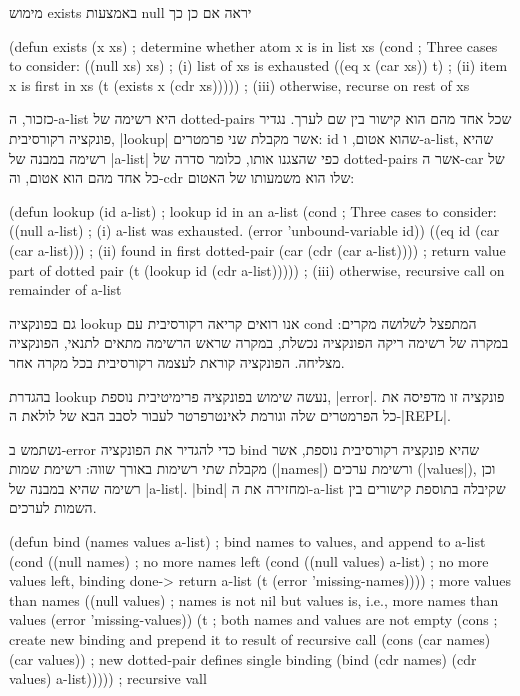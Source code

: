 מימוש exists באמצעות null יראה אם כן כך
\begin{KERNEL}
(defun exists (x xs) ; determine whether atom x is in list xs
  (cond ; Three cases to consider:
    ((null xs) xs) ; (i) list of xs is exhausted
    ((eq x (car xs)) t) ; (ii) item x is first in xs
    (t (exists x (cdr xs))))) ; (iii) otherwise, recurse on rest of xs
\end{KERNEL}

כזכור, ה-a-list היא רשימה של dotted-pairs שכל אחד מהם הוא קישור בין שם לערך.
נגדיר פונקציה רקורסיבית, \E|lookup| אשר מקבלת שני פרמטרים: id שהוא אטום,
ו-a-list, שהיא רשימה במבנה של \E|a-list| כפי שהצגנו אותו, כלומר סדרה של
dotted-pairs אשר ה-car של כל אחד מהם הוא אטום, וה-cdr שלו הוא משמעותו של האטום:
\begin{KERNEL}
(defun lookup (id a-list) ; lookup id in an a-list
  (cond ; Three cases to consider:
    ((null a-list) ; (i) a-list was exhausted.
      (error 'unbound-variable id))
    ((eq id (car (car a-list))) ; (ii) found in first dotted-pair
      (car (cdr (car a-list)))) ; return value part of dotted pair
    (t (lookup id (cdr a-list))))) ; (iii) otherwise, recursive call on remainder of a-list
\end{KERNEL}
גם בפונקציה lookup אנו רואים קריאה רקורסיבית עם cond המתפצל לשלושה מקרים: במקרה
של רשימה ריקה הפונקציה נכשלת, במקרה שראש הרשימה מתאים לתנאי, הפונקציה מצליחה.
הפונקציה קוראת לעצמה רקורסיבית בכל מקרה אחר.

בהגדרת lookup נעשה שימוש בפונקציה פרימיטיבית נוספת, \E|error|. פונקציה זו
מדפיסה את כל הפרמטרים שלה וגורמת לאינטרפרטר לעבור לסבב הבא של לולאת ה-\E|REPL|.

נשתמש ב-error כדי להגדיר את הפונקציה bind שהיא פונקציה רקורסיבית נוספת, אשר
מקבלת שתי רשימות באורך שווה: רשימת שמות (\E|names|) ורשימת ערכים (\E|values|),
וכן רשימה שהיא במבנה של \E|a-list|. \E|bind| ומחזירה את ה-a-list
שקיבלה בתוספת קישורים בין השמות לערכים.

\begin{KERNEL}
(defun bind (names values a-list) ; bind names to values, and append to a-list
  (cond ((null names) ; no more names left
        (cond ((null values) a-list) ; no more values left, binding done-> return a-list
              (t (error 'missing-names)))) ; more values than names
        ((null values) ; names is not nil but values is, i.e., more names than values
          (error 'missing-values))
        (t ; both names and values are not empty
          (cons ; create new binding and prepend it to result of recursive call
            (cons (car names) (car values)) ; new dotted-pair defines single binding
            (bind (cdr names) (cdr values) a-list))))) ; recursive vall
\end{KERNEL}

